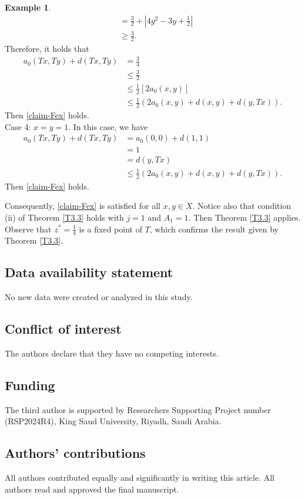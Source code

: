 \documentclass[letterpaper,12pt]{article}
\numberwithin{equation}{section}
\theoremstyle{definition}
\newtheorem{example}[theorem]{Example}
\theoremstyle{remark}
\begin{document}
\begin{example}
$$\begin{aligned}
&=\frac{3}{2}+\left|4y^2-3y+\frac{1}{2}\right|\\
&\geq \frac{3}{2}.
\end{aligned}
$$
Therefore, it holds that 
$$
\begin{aligned}
a_0(Tx,Ty)+d(Tx,Ty) &=\frac{3}{4}\\
&\leq \frac{3}{2}\\
&\leq \frac{1}{2} \left[2 a_0(x,y)\right]\\
&\leq \frac{1}{2} \left(2a_0(x,y)+d(x,y)+d(y,Tx)\right).	
\end{aligned}
$$
Then \eqref{claim-Fex} holds.\\
Case 4: $x=y=1$. In this case, we have
$$
\begin{aligned}
a_0(Tx,Ty)+d(Tx,Ty)&=a_0(0,0)+d(1,1)\\
&=1\\
&=d(y,Tx)\\
&\leq \frac{1}{2} \left(2a_0(x,y)+d(x,y)+d(y,Tx)\right).
\end{aligned}
$$ 
Then \eqref{claim-Fex} holds. 

Consequently,  \eqref{claim-Fex} is satisfied for all $x,y\in X$. Notice also that condition (ii) of Theorem \ref{T3.3} holds with $j=1$ and $A_1=1$. Then Theorem \ref{T3.3} applies. Observe that $z^*=\frac{1}{4}$ is a fixed point of $T$, which confirms the result given by Theorem \ref{T3.3}. 
\end{example}






\subsection*{Data availability statement}
No new data were created or analyzed in this study.

\subsection*{Conflict of interest}
The authors declare that they have no competing interests.

\subsection*{Funding}
The third author  is supported by Researchers Supporting Project number (RSP2024R4), King Saud University, Riyadh, Saudi Arabia.

\subsection*{Authors' contributions}
All authors contributed equally and significantly in writing this article. All authors read and approved the final manuscript.
\end{document}
